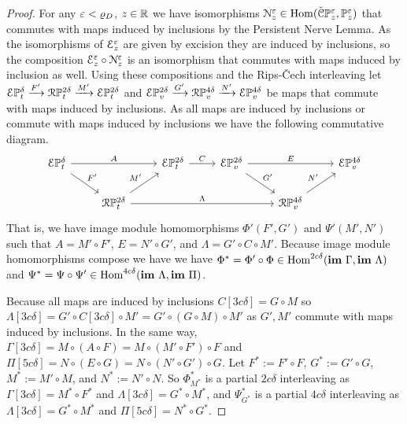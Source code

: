 \begin{proof}
  For any $\varepsilon < \varrho_D$, $z\in\mathbb{R}$ we have isomorphisms $\mathcal{N}_z^\varepsilon\in\mathrm{Hom}(\check{\mathcal{C}}\mathbb{P}_{z}^{\varepsilon}, \mathbb{P}_{z}^{\varepsilon})$ that commutes with maps induced by inclusions by the Persistent Nerve Lemma.
  As the isomorphisms of $\mathcal{E}_z^\varepsilon$ are given by excision they are induced by inclusions, so the composition $\mathcal{E}_z^\varepsilon\circ \mathcal{N}_z^\varepsilon$ is an isomorphism that commutes with maps induced by inclusion as well.
  Using these compositions and the Rips-\v Cech interleaving let $\mathcal{E}\mathbb{P}_{t}^{\delta}\xrightarrow{F'}\mathcal{R}\mathbb{P}_{t}^{2\delta}\xrightarrow{M'} \mathcal{E}\mathbb{P}_{t}^{2\delta}$ and $\mathcal{E}\mathbb{P}_{v}^{2\delta}\xrightarrow{G'}\mathcal{R}\mathbb{P}_{v}^{4\delta}\xrightarrow{N'} \mathcal{E}\mathbb{P}_{v}^{4\delta}$ be maps that commute with maps induced by inclusions.
  As all maps are induced by inclusions or commute with maps induced by inclusions we have the following commutative diagram.
  \begin{equation}
    \begin{tikzcd}
      \E\PP{t}{\delta}\arrow{rr}{A}\arrow{dr}{F'} & &
      \E\PP{t}{2\delta}\arrow{r}{C} &
      \E\PP{v}{2\delta}\arrow{rr}{E}\arrow{dr}{G'} & &
      \E\PP{v}{4\delta}\\
      & \RPP{t}{2\delta}\arrow{ur}{M'}\arrow[to=RV, "\Lambda"] & &
      & |[alias=RV]|\RPP{v}{4\delta}\arrow{ur}{N'} &
    \end{tikzcd}
  \end{equation}
  That is, we have image module homomorphisms $\Phi'(F', G')$ and $\Psi'(M', N')$ such that $A = M'\circ F'$, $E = N'\circ G'$, and $\Lambda = G'\circ C\circ M'$.
  Because image module homomorphisms compose we have we have $\Phi^* = \Phi'\circ \Phi\in\mathrm{Hom}^{2c\delta}(\mathbf{im}~\Gamma, \mathbf{im}~\Lambda)$ and $\Psi^* = \Psi\circ\Psi'\in\mathrm{Hom}^{4c\delta}(\mathbf{im}~\Lambda, \mathbf{im}~\Pi)$.

  Because all maps are induced by inclusions $C[3c\delta] = G\circ M$ so $\Lambda[3c\delta] = G'\circ C[3c\delta]\circ M' = G'\circ (G\circ M)\circ M'$ as $G', M'$ commute with maps induced by inclusions.
  In the same way, $\Gamma[3c\delta] = M\circ (A\circ F) = M\circ (M'\circ F')\circ F$ and $\Pi[5c\delta] = N\circ (E\circ G) = N\circ (N'\circ G')\circ G$.
  Let $F^*:= F'\circ F$, $G^*:= G'\circ G$, $M^*:=M'\circ M$, and $N^*:=N'\circ N$.
  So $\Phi^*_{M^*}$ is a partial $2c\delta$ interleaving as $\Gamma[3c\delta] = M^*\circ F^*$ and $\Lambda[3c\delta] = G^*\circ M^*$, and $\Psi^*_{G^*}$ is a partial $4c\delta$ interleaving as $\Lambda[3c\delta] = G^*\circ M^*$ and $\Pi[5c\delta] = N^*\circ G^*$.
\end{proof}

